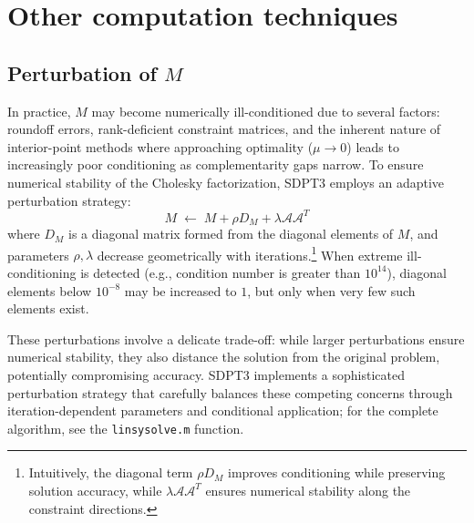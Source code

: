 \section{Other computation techniques}
\subsection{Perturbation of \boldmath $M$ }
In practice, $M$ may become numerically ill-conditioned due to several factors: roundoff errors, rank-deficient constraint matrices, and the inherent nature of interior-point methods where approaching optimality ($\mu \to 0$) leads to increasingly poor conditioning as complementarity gaps narrow.
To ensure numerical stability of the Cholesky factorization, SDPT3 employs an adaptive perturbation strategy:
\[
  M \;\leftarrow\; M + \rho D_M + \lambda \mathcal{A}\mathcal{A}^T
\]
where $D_M$ is a diagonal matrix formed from the diagonal elements of $M$, and parameters $\rho, \lambda$ decrease geometrically with iterations.\footnote{
  Intuitively, the diagonal term $\rho D_M$ improves conditioning while preserving solution accuracy, while $\lambda \mathcal{A}\mathcal{A}^T$ ensures numerical stability along the constraint directions.
}
When extreme ill-conditioning is detected (e.g., condition number is greater than $10^{14}$), diagonal elements below $10^{-8}$ may be increased to $1$, but only when very few such elements exist.

These perturbations involve a delicate trade-off: while larger perturbations ensure numerical stability, they also distance the solution from the original problem, potentially compromising accuracy. SDPT3 implements a sophisticated perturbation strategy that carefully balances these competing concerns through iteration-dependent parameters and conditional application; for the complete algorithm, see the \texttt{linsysolve.m} function.


